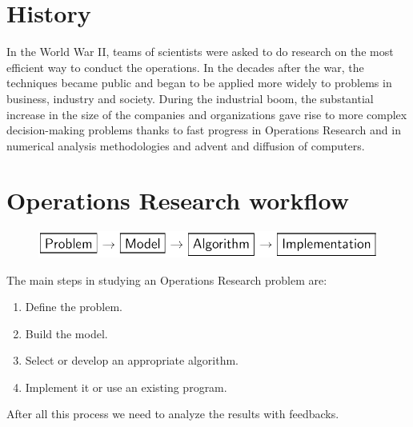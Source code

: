\documentclass[12pt, a4paper]{report}
\newtheorem[style=M,bodystyle=\normalfont]{theorem}{Theorem}
\newtheorem[style=M,bodystyle=\normalfont]{corollary}{Corollary}
\newtheorem[style=M,bodystyle=\normalfont]{lemma}{Lemma}
\newtheorem[style=M,bodystyle=\normalfont]{definition}{Definition}
\begin{document}
    \section{History}
    In the World War II, teams of scientists were asked to do research on the most efficient way to conduct the operations.
    In the decades after the war, the techniques became public and began to be applied more widely to problems in business, industry and society.
    During the industrial boom, the substantial increase in the size of the companies and organizations gave rise to more complex decision-making problems thanks to
    fast progress in Operations Research and in numerical analysis methodologies and advent and diffusion of computers. 

    \section{Operations Research workflow}
    \begin{figure}[H]
        \centering
        \includegraphics[width=1\linewidth]{images/study.png}
    \end{figure}
    The main steps in studying an Operations Research problem are: 
    \begin{enumerate}
        \item Define the problem.
        \item Build the model.
        \item Select or develop an appropriate algorithm. 
        \item Implement it or use an existing program. 
    \end{enumerate}
    After all this process we need to analyze the results with feedbacks. 
\end{document}
